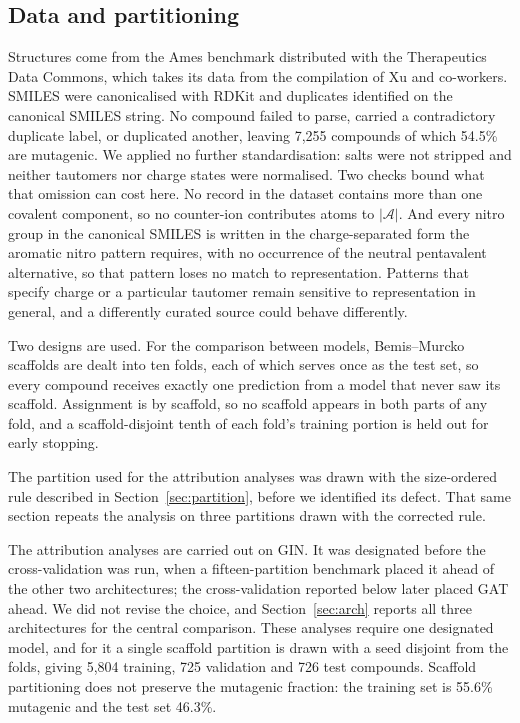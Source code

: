 \documentclass[journal=jcisd8,manuscript=article]{achemso}
\begin{document}
\subsection{Data and partitioning}

Structures come from the Ames benchmark distributed with the Therapeutics Data
Commons,\cite{huang2021} which takes its data from the compilation of Xu and
co-workers.\cite{xu2012} SMILES were canonicalised with RDKit\cite{rdkit} and duplicates
identified on the canonical SMILES string. No compound failed to parse, carried a
contradictory duplicate label, or duplicated another, leaving 7,255 compounds of which 54.5\%
are mutagenic. We applied no further standardisation: salts were not stripped and neither
tautomers nor charge states were normalised. Two checks bound what that omission can cost
here. No record in the dataset contains more than one covalent component, so no counter-ion
contributes atoms to $|\mathcal{A}|$. And every nitro group in the canonical SMILES is written
in the charge-separated form the aromatic nitro pattern requires, with no occurrence of the
neutral pentavalent alternative, so that pattern loses no match to representation. Patterns
that specify charge or a particular tautomer remain sensitive to representation in general,
and a differently curated source could behave differently.

Two designs are used. For the comparison between models, Bemis--Murcko
scaffolds\cite{bemis1996} are dealt into ten folds, each of which serves once as the test
set, so every compound receives exactly one prediction from a model that never saw its
scaffold. Assignment is by scaffold, so no scaffold appears in both parts of any fold, and a
scaffold-disjoint tenth of each fold's training portion is held out for early stopping.

The partition used for the attribution analyses was drawn with the size-ordered rule
described in Section~\ref{sec:partition}, before we identified its defect. That same section
repeats the analysis on three partitions drawn with the corrected rule.

The attribution analyses are carried out on GIN. It was designated before the
cross-validation was run, when a fifteen-partition benchmark placed it ahead of the other two
architectures; the cross-validation reported below later placed GAT ahead. We did not revise
the choice, and Section~\ref{sec:arch} reports all three architectures for the central
comparison. These analyses require one designated model, and for it a single scaffold
partition is drawn with a seed disjoint from the folds, giving 5,804 training, 725 validation
and 726 test compounds. Scaffold partitioning does not preserve the mutagenic fraction: the
training set is 55.6\% mutagenic and the test set 46.3\%.
\end{document}
